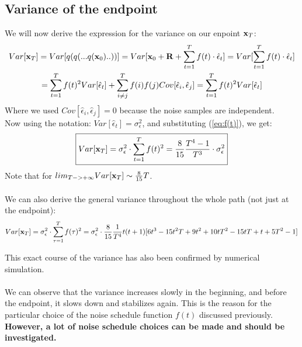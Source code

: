 \documentclass[twocolumn]{article}
\begin{document}
\begin{appendices}
\subsection{Variance of the endpoint}
We will now derive the expression for the variance on our enpoint $\bold{x}_T$:
\begin{multline}
    Var[\bold{x}_T] = Var[q(q(...q(\bold{x}_0)..))] = Var[\bold{x}_0 + \bold{R} + \sum_{t=1}^{T} f(t) \cdot \hat{\epsilon}_t] = Var[\sum_{t=1}^{T} f(t) \cdot \hat{\epsilon}_t]\\ = \sum_{t=1}^{T} f(t)^2 Var[\hat{\epsilon}_t] + \sum_{i \neq j}^{T} f(i) f(j) Cov[\hat{\epsilon}_i, \hat{\epsilon}_j] = \sum_{t=1}^{T} f(t)^2 Var[\hat{\epsilon}_t]
\end{multline}
Where we used $Cov[\hat{\epsilon}_i, \hat{\epsilon}_j] = 0$ because the noise samples are independent. \\
Now using the notation: $Var[\hat{\epsilon}_t] = \sigma_{\epsilon}^2$, and substituting (\ref{eq:f(t)}), we get:
\begin{equation}
    \boxed{Var[\bold{x}_T] = \sigma_{\epsilon}^2 \cdot \sum_{t=1}^{T} f(t)^2 = \frac{8}{15} \frac{T^4 - 1}{T^3} \cdot \sigma_{\epsilon}^2}
\end{equation}
Note that for $lim_{T->+\infty} Var[\bold{x}_T] \sim \frac{8}{15} T$.\\
\\
We can also derive the general variance throughout the whole path (not just at the endpoint):
\begin{equation}
    Var[\bold{x}_T] = \sigma_{\epsilon}^2 \cdot \sum_{\tau=1}^{T} f(\tau)^2 = \sigma_{\epsilon}^2 \cdot \frac{8}{15} \frac{1}{T^4} t(t+1)[6t^3 - 15t^2T + 9t^2 + 10tT^2 - 15tT + t + 5T^2 - 1]
\end{equation}
\begin{center}
\end{center}
This exact course of the variance has also been confirmed by numerical simulation.\\
\\
We can observe that the variance increases slowly in the beginning, and before the endpoint, it slows down and stabilizes again. This is the reason for the particular choice of the noise schedule function $f(t)$ discussed previously. \textbf{However, a lot of noise schedule choices can be made and should be investigated.}


\end{appendices}
\end{document}
